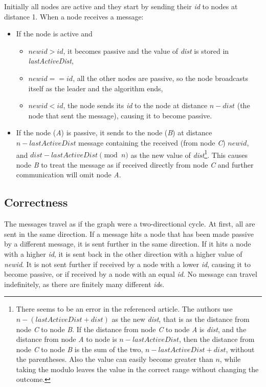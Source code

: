 \documentclass{article}
\begin{document}
Initially all nodes are active and they start by sending their \textit{id} to nodes at distance 1. When a node receives a message:
\begin{itemize}
    \item If the node is active and
    \begin{itemize}
        \item $newid > id$, it becomes passive and the value of \textit{dist} is stored in \textit{lastActiveDist},
		\item $newid == id$, all the other nodes are passive, so the node broadcasts itself as the leader and the algorithm ends,
		\item $newid < id$, the node sends its \textit{id} to the node at distance $n-dist$ (the node that sent the message), causing it to become passive.
    \end{itemize}
	\item If the node (\textit{A}) is passive, it sends to the node (\textit{B}) at distance $n-lastActiveDist$ message containing the received (from node \textit{C}) $newid$, and $dist-lastActiveDist\pmod{n}$ as the new value of \textit{dist}\footnote{There seems to be an error in the referenced article. The authors use $n-(lastActiveDist+dist)$ as the new \textit{dist}, that is as the distance from node \textit{C} to node \textit{B}. If the distance from node \textit{C} to node \textit{A} is \textit{dist}, and the distance from node \textit{A} to node  is $n-lastActiveDist$, then the distance from node \textit{C} to node \textit{B} is the sum of the two, $n-lastActiveDist+dist$, without the parentheses. Also the value can easily become greater than $n$, while taking the modulo leaves the value in the correct range without changing the outcome.}. This causes node \textit{B} to treat the message as if received directly from node \textit{C} and further communication will omit node \textit{A}.
\end{itemize}

\subsection*{Correctness}
The messages travel as if the graph were a two-directional cycle. At first, all are sent in the same direction. If a message hits a node that has been made passive by a different message, it is sent further in the same direction. If it hits a node with a higher \textit{id}, it is sent back in the other direction with a higher value of \textit{newid}. It is not sent further if received by a node with a lower \textit{id}, causing it to become passive, or if received by a node with an equal \textit{id}. No message can travel indefinitely, as there are finitely many different \textit{id}s.
\end{document}

